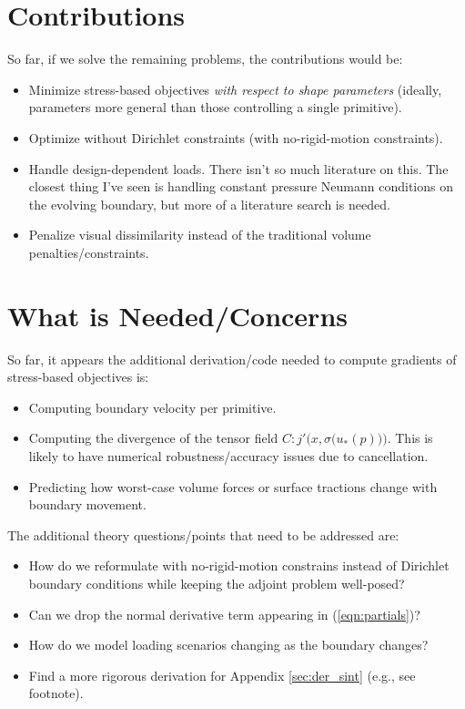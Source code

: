 \documentclass[10pt]{article}
\begin{document}
\section{Contributions}
\label{sec:Contributions}
So far, if we solve the remaining problems, the contributions would be:
\begin{itemize}
    \item Minimize stress-based objectives {\it with respect to shape
        parameters} (ideally, parameters more general than those controlling
        a single primitive).
    \item Optimize without Dirichlet constraints (with no-rigid-motion constraints).
    \item Handle design-dependent loads. There isn't so much literature on this.
        The closest thing I've seen is handling constant pressure Neumann
        conditions on the evolving boundary, but more of a literature search is
        needed.
    \item Penalize visual dissimilarity instead of the traditional volume
          penalties/constraints.
\end{itemize}

\section{What is Needed/Concerns}
So far, it appears the additional derivation/code needed to compute gradients of
stress-based objectives is:
\begin{itemize}
    \item Computing boundary velocity per primitive.
    \item Computing the divergence of the tensor field
          $C: j'\Big(x, \sigma\big(u_*(p)\big)\Big)$. This is likely to have numerical
          robustness/accuracy issues due to cancellation.
    \item Predicting how worst-case volume forces or surface tractions change
        with boundary movement.
\end{itemize}

The additional theory questions/points that need to be addressed are:
\begin{itemize}
    \item How do we reformulate with no-rigid-motion constrains instead of
          Dirichlet boundary conditions while keeping the adjoint problem well-posed?
    \item Can we drop the normal derivative term appearing in (\ref{eqn:partials})?
    \item How do we model loading scenarios changing as the boundary changes?
    \item Find a more rigorous derivation for Appendix \ref{sec:der_sint} (e.g., see footnote).
\end{itemize}
\end{document}
